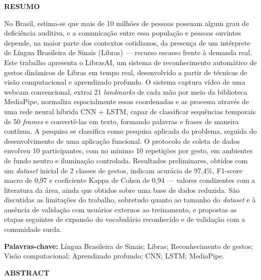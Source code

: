 \begingroup
\begin{center}{\bfseries RESUMO}\end{center}
\vspace{0.3cm}

\noindent No Brasil, estima-se que mais de 10 milhões de pessoas possuam algum
grau de deficiência auditiva, e a comunicação entre essa população e pessoas
ouvintes depende, na maior parte dos contextos cotidianos, da presença de um
intérprete de Língua Brasileira de Sinais (Libras) — recurso escasso frente à
demanda real. Este trabalho apresenta o LibrasAI, um sistema de reconhecimento
automático de gestos dinâmicos de Libras em tempo real, desenvolvido a partir de
técnicas de visão computacional e aprendizado profundo. O sistema captura vídeo
de uma webcam convencional, extrai 21 \textit{landmarks} de cada mão por meio da
biblioteca MediaPipe, normaliza espacialmente essas coordenadas e as processa
através de uma rede neural híbrida CNN + LSTM, capaz de classificar sequências
temporais de 50 \textit{frames} e convertê-las em texto, formando palavras e
frases de maneira contínua. A pesquisa se classifica como pesquisa aplicada do
problema, seguida do desenvolvimento de uma aplicação funcional. O protocolo de
coleta de dados envolveu 10 participantes, com no mínimo 10 repetições por gesto,
em ambientes de fundo neutro e iluminação controlada. Resultados preliminares,
obtidos com um \textit{dataset} inicial de 2 classes de gestos, indicam acurácia
de 97,4\%, F1-score macro de 0,97 e coeficiente Kappa de Cohen de 0,94 — valores
condizentes com a literatura da área, ainda que obtidos sobre uma base de dados
reduzida. São discutidas as limitações do trabalho, sobretudo quanto ao tamanho
do \textit{dataset} e à ausência de validação com usuários externos ao
treinamento, e propostas as etapas seguintes de expansão do vocabulário
reconhecido e de validação com a comunidade surda.

\vspace{0.4cm}
\noindent\textbf{Palavras-chave:} Língua Brasileira de Sinais; Libras;
Reconhecimento de gestos; Visão computacional; Aprendizado profundo; CNN; LSTM;
MediaPipe.

\vspace{1.0cm}
\begin{center}{\bfseries ABSTRACT}\end{center}
\vspace{0.3cm}

